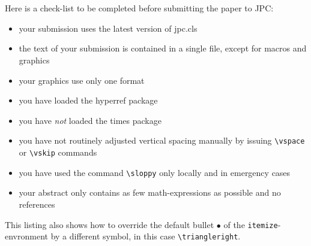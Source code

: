 \documentclass{jpc} %
\theoremstyle{plain}\newtheorem{satz}[thm]{Satz} %
\begin{document}
\section{}
  Here is a check-list to be completed before submitting the paper to
  JPC:
\begin{itemize}[label=$\triangleright$]
\item your submission uses the latest version of jpc.cls
\item the text of your submission is contained in a single file,
  except for macros and graphics
\item your graphics use only one format
\item you have loaded the hyperref package
\item you have \emph{not} loaded the times package
\item you have not routinely adjusted vertical spacing manually by issuing
  \texttt{\textbackslash vspace} or \texttt{\textbackslash vskip} commands
\item you have used the command \texttt{\textbackslash sloppy} only
  locally and in emergency cases
\item your abstract only contains as few math-expressions as possible and no
  references
\end{itemize}

  This listing also shows how to override the default bullet $\bullet$
  of the \texttt{itemize}-envronment by a different symbol, in this
  case \texttt{\textbackslash triangleright}.
\end{document}
